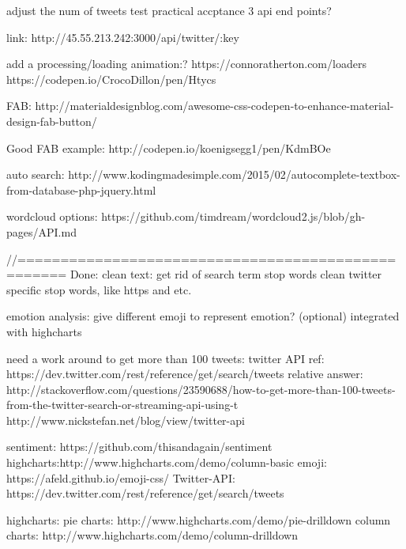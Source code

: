 adjust the num of tweets
test practical accptance
3 api end points?

link:
http://45.55.213.242:3000/api/twitter/:key

add a processing/loading animation:?
https://connoratherton.com/loaders
https://codepen.io/CrocoDillon/pen/Htycs

FAB:
http://materialdesignblog.com/awesome-css-codepen-to-enhance-material-design-fab-button/

Good FAB example:
http://codepen.io/koenigsegg1/pen/KdmBOe


auto search:
http://www.kodingmadesimple.com/2015/02/autocomplete-textbox-from-database-php-jquery.html

wordcloud options:
https://github.com/timdream/wordcloud2.js/blob/gh-pages/API.md


//===================================================
Done:
clean text:
get rid of search term
stop words
clean twitter specific stop words, like https and etc.

emotion analysis:
give different emoji to represent emotion? (optional)
integrated with highcharts

need a work around to get more than 100 tweets:
twitter API ref: https://dev.twitter.com/rest/reference/get/search/tweets
relative answer: http://stackoverflow.com/questions/23590688/how-to-get-more-than-100-tweets-from-the-twitter-search-or-streaming-api-using-t
http://www.nickstefan.net/blog/view/twitter-api


sentiment: https://github.com/thisandagain/sentiment
highcharts:http://www.highcharts.com/demo/column-basic
emoji: https://afeld.github.io/emoji-css/
Twitter-API: https://dev.twitter.com/rest/reference/get/search/tweets

highcharts:
pie charts:  http://www.highcharts.com/demo/pie-drilldown
column charts: http://www.highcharts.com/demo/column-drilldown

